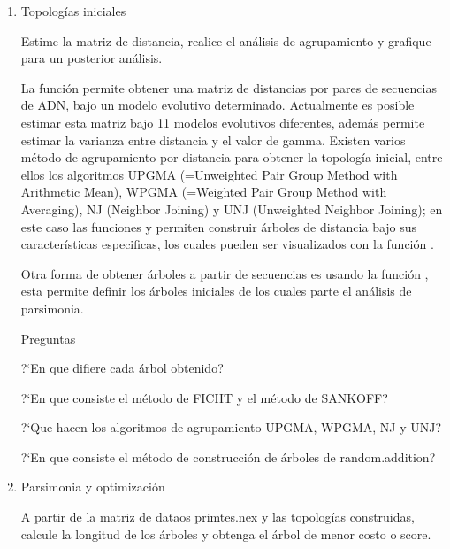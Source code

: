 \begin{itemize}
\begin{enumerate}
\item{Topolog\'ias iniciales}

Estime la matriz de distancia,  realice el an\'alisis de agrupamiento y grafique para un posterior an\'alisis.



La funci\'on  permite obtener una matriz de distancias por pares de secuencias de ADN,  bajo un modelo evolutivo determinado. 
Actualmente es posible estimar esta matriz bajo 11 modelos evolutivos diferentes,  adem\'as permite estimar la varianza entre distancia y el valor de gamma. Existen varios m\'etodo de agrupamiento por distancia para obtener la topolog\'ia inicial,  entre ellos los algoritmos UPGMA (=Unweighted Pair Group Method with Arithmetic Mean),  WPGMA (=Weighted Pair Group Method with Averaging),  NJ (Neighbor Joining) y UNJ (Unweighted Neighbor Joining); en este caso las funciones  y  permiten construir \'arboles de distancia bajo sus caracter\'isticas especificas,  los cuales pueden ser visualizados con la funci\'on .



Otra forma de obtener \'arboles a partir de secuencias es usando la funci\'on ,  esta permite definir los \'arboles iniciales de los cuales parte el an\'alisis de parsimonia.

{Preguntas}

?`En que difiere cada \'arbol obtenido?

?`En que consiste el m\'etodo de FICHT y el m\'etodo de SANKOFF?

?`Que hacen los algoritmos de agrupamiento UPGMA,  WPGMA,  NJ y UNJ?

?`En que consiste el m\'etodo de construcción de \'arboles de random.addition?


\item{Parsimonia y optimización}
 
A partir de la matriz de dataos primtes.nex y las topologías construidas,  calcule la longitud  de los \'arboles y obtenga el \'arbol de menor costo o score.


\end{enumerate}
\end{itemize}
